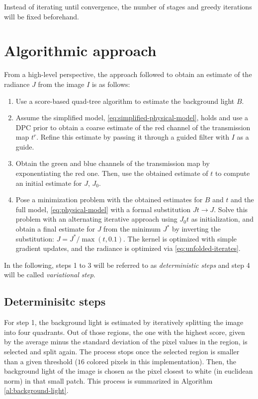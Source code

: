 \documentclass[twocolumn,twoside,a4paper,10pt]{IEEEtran}
\begin{document}
Instead of iterating until convergence, the number of stages and greedy iterations will be fixed beforehand.

\section{Algorithmic approach}

From a high-level perspective, the approach followed to obtain an estimate of the radiance \(J\) from the image \(I\) is as follows:

\begin{enumerate}
  \item Use a score-based quad-tree algorithm to estimate the background light \(B\).
  \item Assume the simplified model, \cref{eq:simplified-physical-model}, holds and use a DPC prior to obtain a coarse estimate of the red channel of the transmission map \(t^r\). Refine this estimate by passing it through a guided filter with \(I\) as a guide.
  \item Obtain the green and blue channels of the transmission map by exponentiating the red one. Then, use the obtained estimate of \(t\) to compute an initial estimate for \(J\), \(J_0\).
  \item Pose a minimization problem with the obtained estimates for \(B\) and \(t\) and the full model, \cref{eq:physical-model} with a formal substitution \(Jt\to J\). Solve this problem with an alternating iterative approach using \(J_0t\) as initialization, and obtain a final estimate for \(J\) from the minimum \(J^*\) by inverting the substitution: \(J=J^*/\max(t, 0.1)\). The kernel is optimized with simple gradient updates, and the radiance is optimized via \cref{eq:unfolded-iterates}.
\end{enumerate}
In the following, steps 1 to 3 will be referred to as \textit{deterministic steps} and step 4 will be called \textit{variational step}.

\subsection{Determinisitc steps}
For step 1, the background light is estimated by iteratively splitting the image into four quadrants. Out of those regions, the one with the highest score, given by the average minus the standard deviation of the pixel values in the region, is selected and split again. The process stops once the selected region is smaller than a given threshold (\(16\) colored pixels in this implementation). Then, the background light of the image is chosen as the pixel closest to white (in euclidean norm) in that small patch. This process is summarized in Algorithm \ref{al:background-light}.
\end{document}
